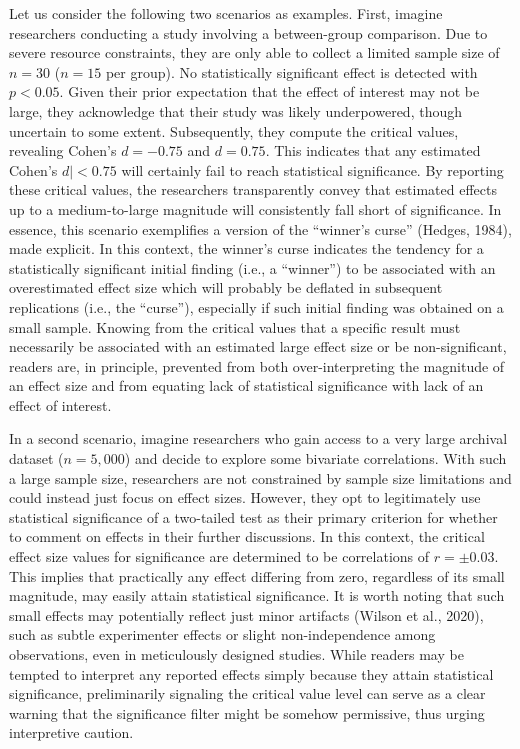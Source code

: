 \documentclass[
  man]{apa7}
\begin{document}
Let us consider the following two scenarios as examples. First, imagine researchers conducting a study involving a between-group comparison. Due to severe resource constraints, they are only able to collect a limited sample size of \(n = 30\) (\(n = 15\) per group). No statistically significant effect is detected with \(p < 0.05\). Given their prior expectation that the effect of interest may not be large, they acknowledge that their study was likely underpowered, though uncertain to some extent. Subsequently, they compute the critical values, revealing Cohen's \(d = -0.75\) and \(d = 0.75\). This indicates that any estimated \textbar Cohen's \(d| < 0.75\) will certainly fail to reach statistical significance. By reporting these critical values, the researchers transparently convey that estimated effects up to a medium-to-large magnitude will consistently fall short of significance. In essence, this scenario exemplifies a version of the ``winner's curse'' (Hedges, 1984), made explicit. In this context, the winner's curse indicates the tendency for a statistically significant initial finding (i.e., a ``winner'') to be associated with an overestimated effect size which will probably be deflated in subsequent replications (i.e., the ``curse''), especially if such initial finding was obtained on a small sample. Knowing from the critical values that a specific result must necessarily be associated with an estimated large effect size or be non-significant, readers are, in principle, prevented from both over-interpreting the magnitude of an effect size and from equating lack of statistical significance with lack of an effect of interest.

In a second scenario, imagine researchers who gain access to a very large archival dataset (\(n = 5,000\)) and decide to explore some bivariate correlations. With such a large sample size, researchers are not constrained by sample size limitations and could instead just focus on effect sizes. However, they opt to legitimately use statistical significance of a two-tailed test as their primary criterion for whether to comment on effects in their further discussions. In this context, the critical effect size values for significance are determined to be correlations of \(r = \pm 0.03\). This implies that practically any effect differing from zero, regardless of its small magnitude, may easily attain statistical significance. It is worth noting that such small effects may potentially reflect just minor artifacts (Wilson et al., 2020), such as subtle experimenter effects or slight non-independence among observations, even in meticulously designed studies. While readers may be tempted to interpret any reported effects simply because they attain statistical significance, preliminarily signaling the critical value level can serve as a clear warning that the significance filter might be somehow permissive, thus urging interpretive caution.
\end{document}

